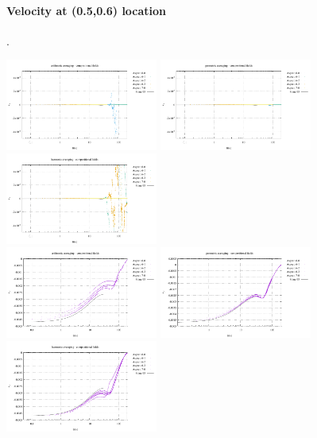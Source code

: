 \paragraph{Velocity at (0.5,0.6) location}.
\begin{center}
\includegraphics[width=5cm]{images/stokes_sphere_fs2D/point_u_arithm_comp}
\includegraphics[width=5cm]{images/stokes_sphere_fs2D/point_u_geom_comp}
\includegraphics[width=5cm]{images/stokes_sphere_fs2D/point_u_harm_comp}\\
\includegraphics[width=5cm]{images/stokes_sphere_fs2D/point_v_arithm_comp}
\includegraphics[width=5cm]{images/stokes_sphere_fs2D/point_v_geom_comp}
\includegraphics[width=5cm]{images/stokes_sphere_fs2D/point_v_harm_comp}\\

\end{center}
